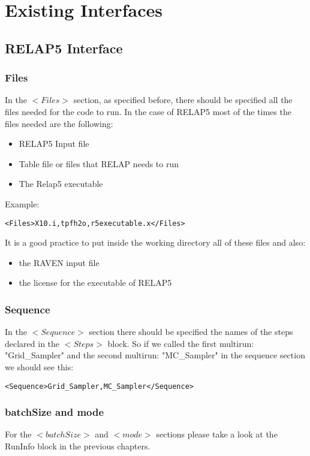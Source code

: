 \section{Existing Interfaces  \\ \vspace{2 mm} {\small }}
\label{sec:existingInterface}
\subsection{RELAP5 Interface}


\subsubsection{Files}
In the $<Files>$ section, as specified before, there should be specified all the files needed for the code to run. In the case of RELAP5 most of the times the files needed are the following:
\begin{itemize}
\item RELAP5 Input file
\item Table file or files that RELAP needs to run
\item The Relap5 executable
\end{itemize}
Example:
\begin{lstlisting}[style=XML]
<Files>X10.i,tpfh2o,r5executable.x</Files>
\end{lstlisting}

It is a good practice to put inside the working directory all of these files and also:
\begin{itemize}
\item the RAVEN input file
\item the license for the executable of RELAP5
\end{itemize}
\subsubsection{Sequence}
In the $<Sequence>$ section there should be specified the names of the steps declared in the $<Steps>$ block. 
So if we called the first multirun: "Grid\_Sampler" and the second multirun: "MC\_Sampler" in the sequence section we should see this:
\begin{lstlisting}[style=XML]
<Sequence>Grid_Sampler,MC_Sampler</Sequence>
\end{lstlisting}
\subsubsection{batchSize and mode}
For the $<batchSize>$ and $<mode>$ sections please take a look at the RunInfo block in the previous chapters.
